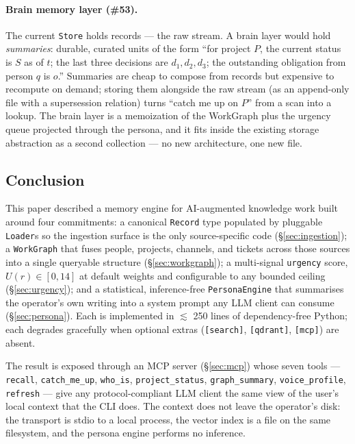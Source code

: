 \paragraph{Brain memory layer (\#53).}
The current \texttt{Store} holds records --- the raw stream. A brain layer would hold \emph{summaries}: durable, curated units of the form ``for project $P$, the current status is $S$ as of $t$; the last three decisions are $d_1, d_2, d_3$; the outstanding obligation from person $q$ is $o$.'' Summaries are cheap to compose from records but expensive to recompute on demand; storing them alongside the raw stream (as an append-only file with a supersession relation) turns ``catch me up on $P$'' from a scan into a lookup. The brain layer is a memoization of the WorkGraph plus the urgency queue projected through the persona, and it fits inside the existing storage abstraction as a second collection --- no new architecture, one new file.

\subsection{Conclusion}
\label{sec:conclusion}

This paper described a memory engine for AI-augmented knowledge work built around four commitments: a canonical \texttt{Record} type populated by pluggable \texttt{Loader}s so the ingestion surface is the only source-specific code (\S\ref{sec:ingestion}); a \texttt{WorkGraph} that fuses people, projects, channels, and tickets across those sources into a single queryable structure (\S\ref{sec:workgraph}); a multi-signal \texttt{urgency} score, $U(r) \in [0, 14]$ at default weights and configurable to any bounded ceiling (\S\ref{sec:urgency}); and a statistical, inference-free \texttt{PersonaEngine} that summarises the operator's own writing into a system prompt any LLM client can consume (\S\ref{sec:persona}). Each is implemented in $\lesssim$ 250 lines of dependency-free Python; each degrades gracefully when optional extras (\verb|[search]|, \verb|[qdrant]|, \verb|[mcp]|) are absent.

The result is exposed through an MCP server (\S\ref{sec:mcp}) whose seven tools --- \texttt{recall}, \texttt{catch\_me\_up}, \texttt{who\_is}, \texttt{project\_status}, \texttt{graph\_summary}, \texttt{voice\_profile}, \texttt{refresh} --- give any protocol-compliant LLM client the same view of the user's local context that the CLI does. The context does not leave the operator's disk: the transport is stdio to a local process, the vector index is a file on the same filesystem, and the persona engine performs no inference.

